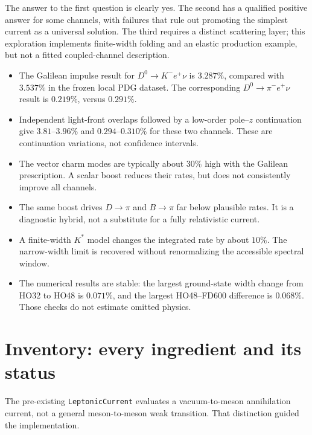 \documentclass[11pt,a4paper]{article}
\begin{document}
The answer to the first question is clearly yes. The second has a qualified positive answer for some channels, with failures that rule out promoting the simplest current as a universal solution. The third requires a distinct scattering layer; this exploration implements finite-width folding and an elastic production example, but not a fitted coupled-channel description.

\begin{itemize}
\item The Galilean impulse result for $D^0\to K^-e^+\nu$ is $3.287\%$, compared with $3.537\%$ in the frozen local PDG dataset. The corresponding $D^0\to\pi^-e^+\nu$ result is $0.219\%$, versus $0.291\%$.
\item Independent light-front overlaps followed by a low-order pole--$z$ continuation give $3.81$--$3.96\%$ and $0.294$--$0.310\%$ for these two channels. These are continuation variations, not confidence intervals.
\item The vector charm modes are typically about $30\%$ high with the Galilean prescription. A scalar boost reduces their rates, but does not consistently improve all channels.
\item The same boost drives $D\to\pi$ and $B\to\pi$ far below plausible rates. It is a diagnostic hybrid, not a substitute for a fully relativistic current.
\item A finite-width $K^*$ model changes the integrated rate by about $10\%$. The narrow-width limit is recovered without renormalizing the accessible spectral window.
\item The numerical results are stable: the largest ground-state width change from HO32 to HO48 is $0.071\%$, and the largest HO48--FD600 difference is $0.068\%$. Those checks do not estimate omitted physics.
\end{itemize}

\section{Inventory: every ingredient and its status}
The pre-existing \texttt{LeptonicCurrent} evaluates a vacuum-to-meson annihilation current, not a general meson-to-meson weak transition. That distinction guided the implementation.
\end{document}
